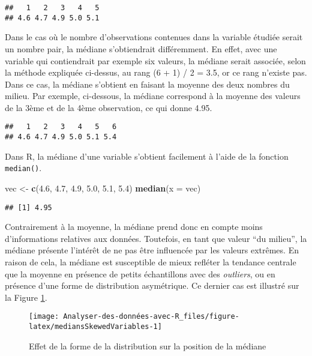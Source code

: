 \documentclass[
  french,
]{book}
\newenvironment{Shaded}{\begin{snugshade}}{\end{snugshade}}
\newcommand{\DataTypeTok}[1]{\textcolor[rgb]{0.13,0.29,0.53}{#1}}
\newcommand{\FloatTok}[1]{\textcolor[rgb]{0.00,0.00,0.81}{#1}}
\newcommand{\KeywordTok}[1]{\textcolor[rgb]{0.13,0.29,0.53}{\textbf{#1}}}
\newcommand{\NormalTok}[1]{#1}
\newcommand{\StringTok}[1]{\textcolor[rgb]{0.31,0.60,0.02}{#1}}
\begin{document}
\begin{verbatim}
##   1   2   3   4   5 
## 4.6 4.7 4.9 5.0 5.1
\end{verbatim}

Dans le cas où le nombre d'observations contenues dans la variable étudiée serait un nombre pair, la médiane s'obtiendrait différemment. En effet, avec une variable qui contiendrait par exemple six valeurs, la médiane serait associée, selon la méthode expliquée ci-dessus, au rang (6 + 1) / 2 = 3.5, or ce rang n'existe pas. Dans ce cas, la médiane s'obtient en faisant la moyenne des deux nombres du milieu. Par exemple, ci-dessous, la médiane correspond à la moyenne des valeurs de la 3ème et de la 4ème observation, ce qui donne 4.95.

\begin{verbatim}
##   1   2   3   4   5   6 
## 4.6 4.7 4.9 5.0 5.1 5.4
\end{verbatim}

Dans R, la médiane d'une variable s'obtient facilement à l'aide de la fonction \texttt{median()}.

\begin{Shaded}
\begin{Highlighting}[]
\NormalTok{vec <-}\StringTok{ }\KeywordTok{c}\NormalTok{(}\FloatTok{4.6}\NormalTok{, }\FloatTok{4.7}\NormalTok{, }\FloatTok{4.9}\NormalTok{, }\FloatTok{5.0}\NormalTok{, }\FloatTok{5.1}\NormalTok{, }\FloatTok{5.4}\NormalTok{)}
\KeywordTok{median}\NormalTok{(}\DataTypeTok{x =}\NormalTok{ vec)}
\end{Highlighting}
\end{Shaded}

\begin{verbatim}
## [1] 4.95
\end{verbatim}

Contrairement à la moyenne, la médiane prend donc en compte moins d'informations relatives aux données. Toutefois, en tant que valeur \enquote{du milieu}, la médiane présente l'intérêt de ne pas être influencée par les valeurs extrêmes. En raison de cela, la médiane est susceptible de mieux refléter la tendance centrale que la moyenne en présence de petits échantillons avec des \emph{outliers}, ou en présence d'une forme de distribution asymétrique. Ce dernier cas est illustré sur la Figure \ref{fig:mediansSkewedVariables}.

\begin{figure}

{\centering \texttt{[image: Analyser-des-données-avec-R\_files/figure-latex/mediansSkewedVariables-1]} 

}

\caption{Effet de la forme de la distribution sur la position de la médiane}\label{fig:mediansSkewedVariables}
\end{figure}
\end{document}
